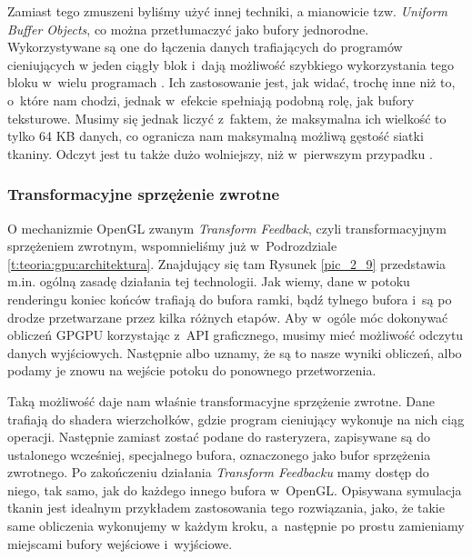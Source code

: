 			Zamiast tego zmuszeni byliśmy użyć innej techniki, a mianowicie tzw. \emph{Uniform Buffer Objects}, co można przetłumaczyć jako bufory jednorodne. Wykorzystywane są one do łączenia danych trafiających do programów cieniujących w jeden ciągły blok i~dają możliwość szybkiego wykorzystania tego bloku w~wielu programach \cite{opengl_wiki}. Ich zastosowanie jest, jak widać, trochę inne niż to, o~które nam chodzi, jednak w~efekcie spełniają podobną rolę, jak bufory teksturowe. Musimy się jednak liczyć z~faktem, że maksymalna ich wielkość to tylko 64 KB danych, co ogranicza nam maksymalną możliwą gęstość siatki tkaniny. Odczyt jest tu także dużo wolniejszy, niż w~pierwszym przypadku \cite{buffers}.
			
			\subsubsection{Transformacyjne sprzężenie zwrotne}
			\label{t:technologie:narzedzia:transformfeedback}
			
			O mechanizmie OpenGL zwanym \emph{Transform Feedback}, czyli transformacyjnym sprzężeniem zwrotnym, wspomnieliśmy już w~Podrozdziale \ref{t:teoria:gpu:architektura}. Znajdujący się tam Rysunek \ref{pic_2_9} przedstawia m.in. ogólną zasadę działania tej technologii. Jak wiemy, dane w potoku renderingu koniec końców trafiają do bufora ramki, bądź tylnego bufora i~są po drodze przetwarzane przez kilka różnych etapów. Aby w~ogóle móc dokonywać obliczeń GPGPU korzystając z~API graficznego, musimy mieć możliwość odczytu danych wyjściowych. Następnie albo uznamy, że są to nasze wyniki obliczeń, albo podamy je znowu na wejście potoku do ponownego przetworzenia. 
			
			Taką możliwość daje nam właśnie transformacyjne sprzężenie zwrotne. Dane trafiają do shadera wierzchołków, gdzie program cieniujący wykonuje na nich ciąg operacji. Następnie zamiast zostać podane do rasteryzera, zapisywane są do ustalonego wcześniej, specjalnego bufora, oznaczonego jako bufor sprzężenia zwrotnego. Po zakończeniu działania \emph{Transform Feedbacku} mamy dostęp do niego, tak samo, jak do każdego innego bufora w~OpenGL. Opisywana symulacja tkanin jest idealnym przykładem zastosowania tego rozwiązania, jako, że takie same obliczenia wykonujemy w każdym kroku, a~następnie po prostu zamieniamy miejscami bufory wejściowe i~wyjściowe. 
		
		
